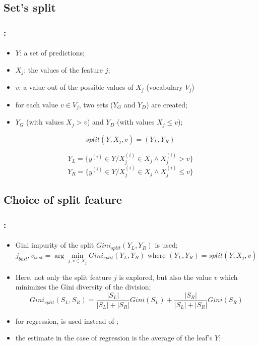 \documentclass[xcolor=table]{beamer}
\begin{document}
\subsection{Set's split}

\begin{frame}
	\frametitle{\insertshortsubtitle: \insertsection}
	\framesubtitle{\insertsubsection}
	
	\begin{itemize}
		\item $Y$: a set of predictions;
		\item $X_j$: the values of the feature $j$;
		\item $v$: a value out of the possible values of $X_j$ (vocabulary $V_j$)
		\item for each value $v \in V_j$, two sets ($Y_G$ and $Y_D$) are created;
		\item $Y_G$ (with values $X_j > v$) and $Y_D$ (with values $X_j \le v$);
	\end{itemize}

	\[split(Y, X_j, v) = (Y_L, Y_R)\]
	
	\[Y_L = \{y^{(i)} \in Y / X_j^{(i)} \in X_j \wedge X_j^{(i)} > v\}\]
	\[Y_R = \{y^{(i)} \in Y / X_j^{(i)} \in X_j \wedge X_j^{(i)} \le v\}\]
	
\end{frame}

\subsection{Choice of split feature}

\begin{frame}
	\frametitle{\insertshortsubtitle: \insertsection}
	\framesubtitle{\insertsubsection}
	
	\begin{itemize}
		\item Gini impurity of the split $Gini_{split}(Y_L, Y_R)$ is used;
		\[ j_{best}, v_{best} = \arg\min_{j, v \in X_j} Gini_{split}(Y_L, Y_R) \text{ where } (Y_L, Y_R) = split(Y, X_j, v)\]
		\item Here, not only the split feature $j$ is explored, but also the value $v$ which minimizes the Gini diversity of the division;
		\[Gini_{split}(S_L, S_R) = \frac{|S_L|}{|S_L| + |S_R|} Gini(S_L) + \frac{|S_R|}{|S_L| + |S_R|} Gini(S_R)\]
		\item for regression,  is used instead of ;
		\item the estimate in the case of regression is the average of the leaf's $Y$;
	\end{itemize}
	
\end{frame}
\end{document}
